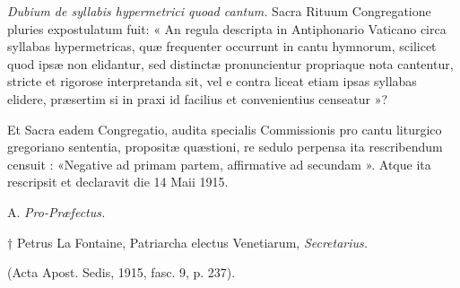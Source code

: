 {\centering{}\par} %

{}

\textit{Dubium de syllabis hypermetrici quoad cantum.} Sacra Rituum Congregatione pluries expostulatum fuit: « An regula descripta in Antiphonario Vaticano circa syllabas hypermetricas, quæ frequenter occurrunt in cantu hymnorum, scilicet quod ipsæ non elidantur, sed distinctæ pronuncientur propriaque nota cantentur, stricte et rigorose interpretanda sit, vel e contra liceat etiam ipsas syllabas elidere, præsertim si in praxi id facilius et convenientius censeatur »?

Et Sacra eadem Congregatio, audita specialis Commissionis pro cantu liturgico gregoriano sententia, propositæ quæstioni, re sedulo perpensa ita rescribendum censuit : «Negative ad primam partem, affirmative ad secundam ». Atque ita rescripsit et declaravit die 14 Maii 1915.

\hfill{A.   \textit{Pro-Præfectus.}}

{\hfill† Petrus La Fontaine, Patriarcha electus Venetiarum, \textit{Secretarius.}}

(Acta Apost. Sedis, 1915, fasc. 9, p. 237).